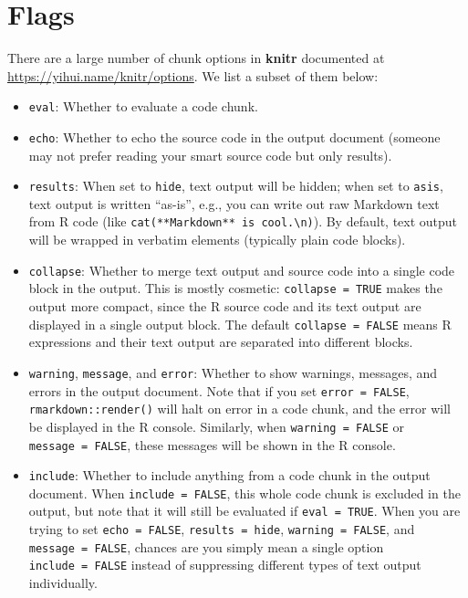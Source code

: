 \documentclass[
]{book}
\begin{document}
\hypertarget{flags}{%
\section{Flags}\label{flags}}

There are a large number of chunk options in \textbf{knitr} documented at \url{https://yihui.name/knitr/options}. We list a subset of them below:

\begin{itemize}
\item
  \texttt{eval}: Whether to evaluate a code chunk.
\item
  \texttt{echo}: Whether to echo the source code in the output document (someone may not prefer reading your smart source code but only results).
\item
  \texttt{results}: When set to \texttt{\textquotesingle{}hide\textquotesingle{}}, text output will be hidden; when set to \texttt{\textquotesingle{}asis\textquotesingle{}}, text output is written ``as-is'', e.g., you can write out raw Markdown text from R code (like \texttt{cat(\textquotesingle{}**Markdown**\ is\ cool.\textbackslash{}n\textquotesingle{})}). By default, text output will be wrapped in verbatim elements (typically plain code blocks).
\item
  \texttt{collapse}: Whether to merge text output and source code into a single code block in the output. This is mostly cosmetic: \texttt{collapse\ =\ TRUE} makes the output more compact, since the R source code and its text output are displayed in a single output block. The default \texttt{collapse\ =\ FALSE} means R expressions and their text output are separated into different blocks.
\item
  \texttt{warning}, \texttt{message}, and \texttt{error}: Whether to show warnings, messages, and errors in the output document. Note that if you set \texttt{error\ =\ FALSE}, \texttt{rmarkdown::render()} will halt on error in a code chunk, and the error will be displayed in the R console. Similarly, when \texttt{warning\ =\ FALSE} or \texttt{message\ =\ FALSE}, these messages will be shown in the R console.
\item
  \texttt{include}: Whether to include anything from a code chunk in the output document. When \texttt{include\ =\ FALSE}, this whole code chunk is excluded in the output, but note that it will still be evaluated if \texttt{eval\ =\ TRUE}. When you are trying to set \texttt{echo\ =\ FALSE}, \texttt{results\ =\ \textquotesingle{}hide\textquotesingle{}}, \texttt{warning\ =\ FALSE}, and \texttt{message\ =\ FALSE}, chances are you simply mean a single option \texttt{include\ =\ FALSE} instead of suppressing different types of text output individually.

\end{itemize}
\end{document}
